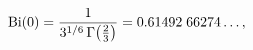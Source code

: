 \[\mathop{\mathrm{Bi}\/}\nolimits\!\left(0\right)=\frac{1}{3^{1/6}\mathop{\Gamma%
\/}\nolimits\!\left(\tfrac{2}{3}\right)}=0.61492\;66274\ldots,\]